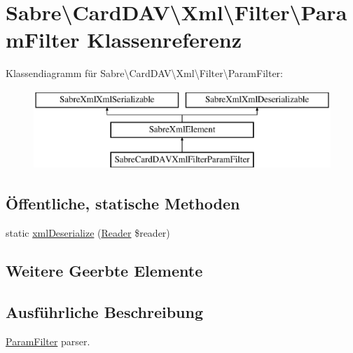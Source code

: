 \hypertarget{class_sabre_1_1_card_d_a_v_1_1_xml_1_1_filter_1_1_param_filter}{}\section{Sabre\textbackslash{}Card\+D\+AV\textbackslash{}Xml\textbackslash{}Filter\textbackslash{}Param\+Filter Klassenreferenz}
\label{class_sabre_1_1_card_d_a_v_1_1_xml_1_1_filter_1_1_param_filter}
Klassendiagramm für Sabre\textbackslash{}Card\+D\+AV\textbackslash{}Xml\textbackslash{}Filter\textbackslash{}Param\+Filter\+:\begin{figure}[H]
\begin{center}
\leavevmode
\includegraphics[height=3.000000cm]{class_sabre_1_1_card_d_a_v_1_1_xml_1_1_filter_1_1_param_filter}
\end{center}
\end{figure}
\subsection*{Öffentliche, statische Methoden}
\begin{DoxyCompactItemize}
\item 
static \mbox{\hyperlink{class_sabre_1_1_card_d_a_v_1_1_xml_1_1_filter_1_1_param_filter_a33d44714654e11cbb4b0340c8135a4e7}{xml\+Deserialize}} (\mbox{\hyperlink{class_sabre_1_1_xml_1_1_reader}{Reader}} \$reader)
\end{DoxyCompactItemize}
\subsection*{Weitere Geerbte Elemente}


\subsection{Ausführliche Beschreibung}
\mbox{\hyperlink{class_sabre_1_1_card_d_a_v_1_1_xml_1_1_filter_1_1_param_filter}{Param\+Filter}} parser.

